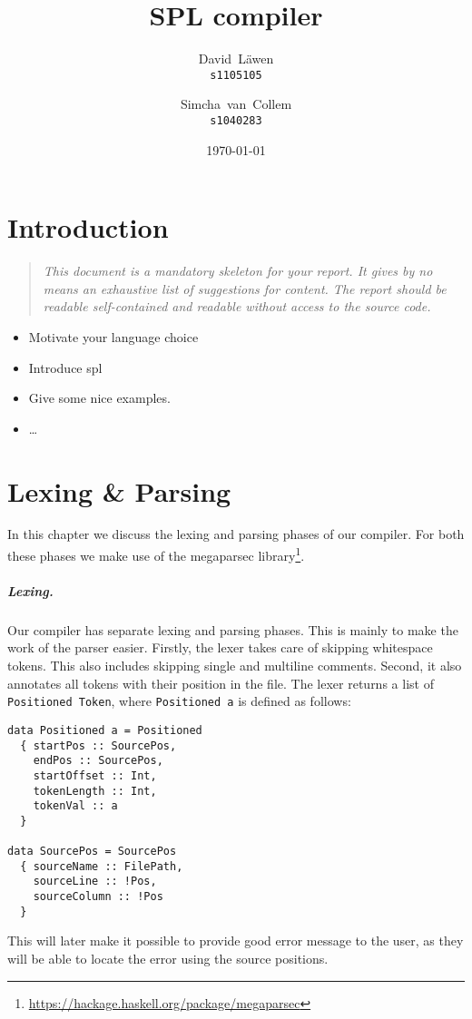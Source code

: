 \documentclass{report}
\author{%
	David~L\"awen\\
	\small\texttt{s1105105}\and
	Simcha~van~Collem\\
	\small\texttt{s1040283}
}
\date{\today}
\title{SPL compiler}
\begin{document}
\maketitle%

\tableofcontents%

\chapter{Introduction}
\begin{quote}
	\it
	This document is a mandatory skeleton for your report.
	It gives by no means an exhaustive list of suggestions for content.
	The report should be readable self-contained and readable without access to the source code.
\end{quote}
\begin{itemize}
	\item Motivate your language choice
	\item Introduce spl
	\item Give some nice examples.
	\item \ldots
\end{itemize}

\chapter{Lexing \& Parsing}
In this chapter we discuss the lexing and parsing phases of our compiler.
For both these phases we make use of the megaparsec library\footnote{\url{https://hackage.haskell.org/package/megaparsec}}.

\paragraph{Lexing.}
Our compiler has separate lexing and parsing phases.
This is mainly to make the work of the parser easier.
Firstly, the lexer takes care of skipping whitespace tokens.
This also includes skipping single and multiline comments.
Second, it also annotates all tokens with their position in the file.
The lexer returns a list of \texttt{Positioned Token},
where \texttt{Positioned a} is defined as follows:
\begin{verbatim}
data Positioned a = Positioned
  { startPos :: SourcePos,
    endPos :: SourcePos,
    startOffset :: Int,
    tokenLength :: Int,
    tokenVal :: a
  }

data SourcePos = SourcePos
  { sourceName :: FilePath,
    sourceLine :: !Pos,
    sourceColumn :: !Pos
  }
\end{verbatim}
This will later make it possible to provide good error message to the user,
as they will be able to locate the error using the source positions.
\end{document}
